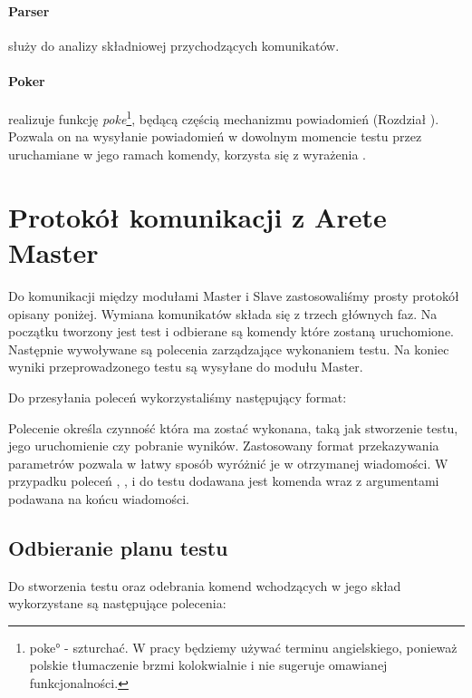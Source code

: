 \documentclass[00-praca-magisterska.tex]{subfiles}
\begin{document}
\paragraph{Parser} służy do analizy składniowej przychodzących komunikatów.

\paragraph{Poker} realizuje funkcję \textit{poke}\footnote{\ang{poke} -
szturchać. W pracy będziemy używać terminu angielskiego, ponieważ polskie
tłumaczenie brzmi kolokwialnie i nie sugeruje omawianej funkcjonalności.},
będącą częścią mechanizmu powiadomień (Rozdział ).  Pozwala on na wysyłanie powiadomień w dowolnym momencie testu
przez uruchamiane w jego ramach komendy, korzysta się z wyrażenia 
.

\section{Protokół komunikacji z Arete Master}
\label{arete-slave-protokol}

Do komunikacji między modułami Master i Slave zastosowaliśmy prosty protokół
opisany poniżej. Wymiana komunikatów składa się z trzech głównych faz. Na
początku tworzony jest test i odbierane są komendy które zostaną uruchomione.
Następnie wywoływane są polecenia zarządzające wykonaniem testu.  Na koniec
wyniki przeprowadzonego testu są wysyłane do modułu Master. 

Do przesyłania poleceń wykorzystaliśmy następujący format:


Polecenie określa czynność która ma zostać wykonana, taką jak stworzenie testu,
jego uruchomienie czy pobranie wyników. Zastosowany format przekazywania
parametrów  pozwala w łatwy sposób wyróżnić je w otrzymanej
wiadomości. W przypadku poleceń , ,  i
 do testu dodawana jest komenda wraz z argumentami podawana na końcu
wiadomości.

\subsection{Odbieranie planu testu}
\label{arete-slave-odbieranie-testu}

Do stworzenia testu oraz odebrania komend wchodzących w jego skład wykorzystane
są następujące polecenia:
\end{document}
